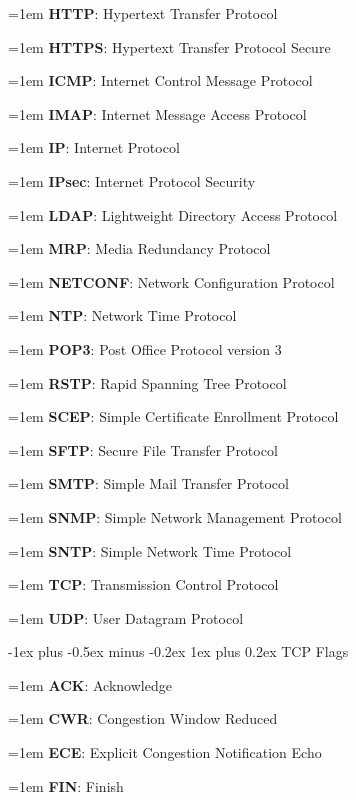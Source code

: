 \documentclass[letterpaper,8pt]{extarticle}
\makeatletter
\newcommand{\definition}[2]{
  \hangindent=1em
  \textbf{#1}: #2%
}
\renewcommand{\subsubsection}{\@startsection{subsubsection}{3}{0mm}%
  {-1ex plus -0.5ex minus -0.2ex}%
  {1ex plus 0.2ex}%
{\color{h3} \normalfont\fontsize{5.5}{5.5}\selectfont\bfseries\itshape}}
\makeatother
\begin{document}
\begin{multicols*}{5}
\begin{multicols*}{2}
    \definition{HTTP}{Hypertext Transfer Protocol}
    
    \definition{HTTPS}{Hypertext Transfer Protocol Secure}
    
    \definition{ICMP}{Internet Control Message Protocol}
    
    \definition{IMAP}{Internet Message Access Protocol}
    
    \definition{IP}{Internet Protocol}
    
    \definition{IPsec}{Internet Protocol Security}
    
    \definition{LDAP}{Lightweight Directory Access Protocol}
    
    \definition{MRP}{Media Redundancy Protocol}
    
    \definition{NETCONF}{Network Configuration Protocol}
    
    \definition{NTP}{Network Time Protocol}
    
    \definition{POP3}{Post Office Protocol version 3}
    
    \definition{RSTP}{Rapid Spanning Tree Protocol}
    
    \definition{SCEP}{Simple Certificate Enrollment Protocol}
    
    \definition{SFTP}{Secure File Transfer Protocol}
    
    \definition{SMTP}{Simple Mail Transfer Protocol}
    
    \definition{SNMP}{Simple Network Management Protocol}
    
    \definition{SNTP}{Simple Network Time Protocol}
    
    \definition{TCP}{Transmission Control Protocol}
    
    \definition{UDP}{User Datagram Protocol}
    
  \end{multicols*}
  
  \subsubsection{TCP Flags}
  
  \begin{multicols*}{2}
    
    \definition{ACK}{Acknowledge}
    
    \definition{CWR}{Congestion Window Reduced}
    
    \definition{ECE}{Explicit Congestion Notification Echo}
    
    \definition{FIN}{Finish}
    

\end{multicols*}
\end{multicols*}
\end{document}
